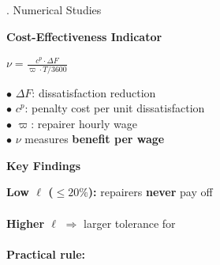 \begin{block}{\fontsize{46}{54}. Numerical Studies}
\begin{minipage}[t][22cm][s]{0.44\linewidth}
    \colorbox{HKUGreen!10}{\parbox{0.96\linewidth}{
        \vspace{0.3cm}
        {\fontsize{40}{48}\selectfont \textbf{Cost-Effectiveness Indicator}}
        
        \vspace{0.55cm}
        \begin{center}
        {\fontsize{48}{58}\selectfont $\displaystyle \nu = \frac{c^p \cdot \Delta F}{\varpi \cdot T/3600}$}
        \end{center}
        
        \vspace{0.55cm}
        {\fontsize{40}{48}\selectfont
        $\bullet$ $\Delta F$: dissatisfaction reduction\\[0.5cm]
        $\bullet$ $c^p$: penalty cost per unit dissatisfaction\\[0.5cm]
        $\bullet$ $\varpi$: repairer hourly wage\\[0.5cm]
        $\bullet$ $\nu$ measures \textbf{benefit per wage}
        }
        \vspace{0.3cm}
    }}
    
    \vspace{0.8cm}
    
    \colorbox{AccentGold!20}{\parbox{0.96\linewidth}{
        \vspace{0.3cm}
        {\fontsize{40}{48}\selectfont \textbf{Key Findings}}
        
        \vspace{0.35cm}
        {\fontsize{40}{48}\selectfont
         \textbf{Low $\ell$ ($\le 20\%$):} repairers \textbf{never} pay off\\[0.15cm]
        \\[0.65cm]
         \textbf{Higher $\ell$} $\Rightarrow$ larger tolerance for\\[0.15cm]
        \\[0.65cm]
         \textbf{Practical rule:}\\[0.55cm]
        \\[0.15cm]
        }
        \vspace{0.3cm}
    }}
    
    \vspace{0pt}
\end{minipage}

\end{block}
